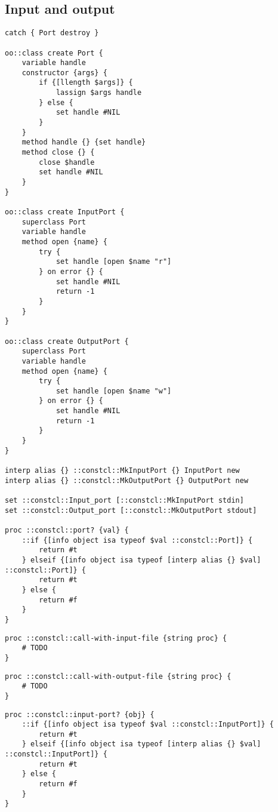 \documentclass{report}
\begin{document}
\subsection{Input and output}
\label{input-and-output}
\noindent\makebox[\linewidth]{\rule{\linewidth}{0.4pt}}
\begin{lstlisting}
catch { Port destroy }
 
oo::class create Port {
    variable handle
    constructor {args} {
        if {[llength $args]} {
            lassign $args handle
        } else {
            set handle #NIL
        }
    }
    method handle {} {set handle}
    method close {} {
        close $handle
        set handle #NIL
    }
}
 
oo::class create InputPort {
    superclass Port
    variable handle
    method open {name} {
        try {
            set handle [open $name "r"]
        } on error {} {
            set handle #NIL
            return -1
        }
    }
}
 
oo::class create OutputPort {
    superclass Port
    variable handle
    method open {name} {
        try {
            set handle [open $name "w"]
        } on error {} {
            set handle #NIL
            return -1
        }
    }
}
 
interp alias {} ::constcl::MkInputPort {} InputPort new
interp alias {} ::constcl::MkOutputPort {} OutputPort new
 
set ::constcl::Input_port [::constcl::MkInputPort stdin]
set ::constcl::Output_port [::constcl::MkOutputPort stdout]
 
proc ::constcl::port? {val} {
    ::if {[info object isa typeof $val ::constcl::Port]} {
        return #t
    } elseif {[info object isa typeof [interp alias {} $val] ::constcl::Port]} {
        return #t
    } else {
        return #f
    }
}
\end{lstlisting}
\noindent\makebox[\linewidth]{\rule{\linewidth}{0.4pt}}
\noindent\makebox[\linewidth]{\rule{\linewidth}{0.4pt}}
\begin{lstlisting}
proc ::constcl::call-with-input-file {string proc} {
    # TODO
}
\end{lstlisting}
\noindent\makebox[\linewidth]{\rule{\linewidth}{0.4pt}}
\noindent\makebox[\linewidth]{\rule{\linewidth}{0.4pt}}
\begin{lstlisting}
proc ::constcl::call-with-output-file {string proc} {
    # TODO
}
\end{lstlisting}
\noindent\makebox[\linewidth]{\rule{\linewidth}{0.4pt}}
\noindent\makebox[\linewidth]{\rule{\linewidth}{0.4pt}}
\begin{lstlisting}
proc ::constcl::input-port? {obj} {
    ::if {[info object isa typeof $val ::constcl::InputPort]} {
        return #t
    } elseif {[info object isa typeof [interp alias {} $val] ::constcl::InputPort]} {
        return #t
    } else {
        return #f
    }
}
\end{lstlisting}
\end{document}
